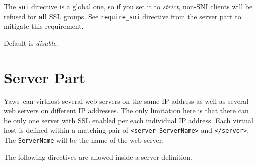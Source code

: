 \documentclass[11pt,oneside,english]{book}
\newcommand{\Yaws}            %
        {{\sc Yaws}}
\begin{document}
\begin{itemize}
              The \verb+sni+ directive is a global one, so if you set it to
              \textit{strict}, non-SNI clients will be refused for \textbf{all}
              SSL groups. See \verb+require_sni+ directive from the server part
              to mitigate this requirement.

              Default is \textit{disable}.
\end{itemize}



\section{Server Part}

\Yaws\ can virthost several web servers on the same IP address as well
as several web servers on different IP addresses.  The only limitation
here is that there can be only one server with SSL enabled per each
individual IP address.  Each virtual host is defined within a matching
pair of \verb+<server ServerName>+ and \verb+</server>+.  The
\verb+ServerName+ will be the name of the web server.

The following directives are allowed inside a server definition.
\end{document}
